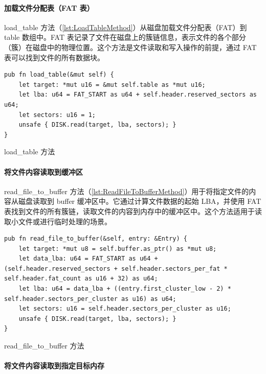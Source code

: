 \paragraph{加载文件分配表（FAT 表）}

load\_table 方法（\cref{lst:LoadTableMethod}）从磁盘加载文件分配表（FAT）到 table 数组中。FAT 表记录了文件在磁盘上的簇链信息，表示文件的各个部分（簇）在磁盘中的物理位置。这个方法是文件读取和写入操作的前提，通过 FAT 表可以找到文件的所有数据块。

\begin{listing}[htbp]
    \begin{verbatim}
pub fn load_table(&mut self) {
    let target: *mut u16 = &mut self.table as *mut u16;
    let lba: u64 = FAT_START as u64 + self.header.reserved_sectors as u64;
    let sectors: u16 = 1;
    unsafe { DISK.read(target, lba, sectors); }
}
    \end{verbatim}
    \caption{load\_table 方法}\label{lst:LoadTableMethod}
\end{listing}

\paragraph{将文件内容读取到缓冲区}

read\_file\_to\_buffer 方法（\cref{lst:ReadFileToBufferMethod}）用于将指定文件的内容从磁盘读取到 buffer 缓冲区中。它通过计算文件数据的起始 LBA，并使用 FAT 表找到文件的所有簇链，读取文件的内容到内存中的缓冲区中。这个方法适用于读取小文件或进行临时处理的场景。

\begin{listing}[htbp]
    \begin{verbatim}
pub fn read_file_to_buffer(&self, entry: &Entry) {
    let target: *mut u8 = self.buffer.as_ptr() as *mut u8;
    let data_lba: u64 = FAT_START as u64 + (self.header.reserved_sectors + self.header.sectors_per_fat * self.header.fat_count as u16 + 32) as u64;
    let lba: u64 = data_lba + ((entry.first_cluster_low - 2) * self.header.sectors_per_cluster as u16) as u64;
    let sectors: u16 = self.header.sectors_per_cluster as u16;
    unsafe { DISK.read(target, lba, sectors); }
}
    \end{verbatim}
    \caption{read\_file\_to\_buffer 方法}\label{lst:ReadFileToBufferMethod}
\end{listing}

\paragraph{将文件内容读取到指定目标内存}

